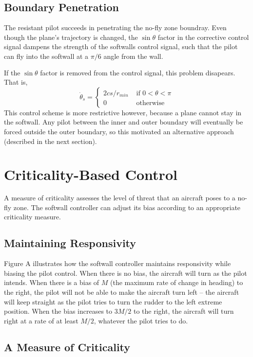 \documentclass[11pt]{article}
\begin{document}
\subsection{Boundary Penetration}

The resistant pilot succeeds in penetrating the no-fly zone boundray.
Even though the plane's trajectory is changed, the $\sin{\theta}$ factor
in the corrective control signal dampens the strength of the softwalls
control signal, such that the pilot can fly into the softwall at a
$\pi/6$ angle from the wall.

If the $\sin{\theta}$ factor is removed from the control signal, this
problem disapears.  That is,
\[
\dot{\theta}_s = \left \{
\begin{array}{ll}
2 c s/r_{min}& \mbox{ if } 0 < \theta < \pi\\
0 & \mbox{ otherwise}
\end{array}
\right .
\]
This control scheme is more restrictive however, because a plane
cannot stay in the softwall.  Any pilot between the inner and outer
boundary will eventually be forced outside the outer boundary, so this
motivated an alternative approach (described in the next section).

\section{Criticality-Based Control}

A measure of criticality assesses the level of threat that an aircraft poses to
a no-fly zone. The softwall controller can adjust its bias according to an
appropriate criticality measure.

\subsection{Maintaining Responsivity}

Figure A illustrates how the softwall controller maintains responsivity while
biasing the pilot control. When there is no bias, the aircraft will turn as the
pilot intends. When there is a bias of $M$ (the maximum rate of change in
heading) to the right, the pilot will not be able to make the aircraft turn 
left -- the aircraft will keep straight as the pilot tries to turn the rudder
to the left extreme position. 
When the bias increases to $3M/2$ to the right, the aircraft will turn right at
a rate of at least $M/2$, whatever the pilot tries to do.

\subsection{A Measure of Criticality}
\end{document}
